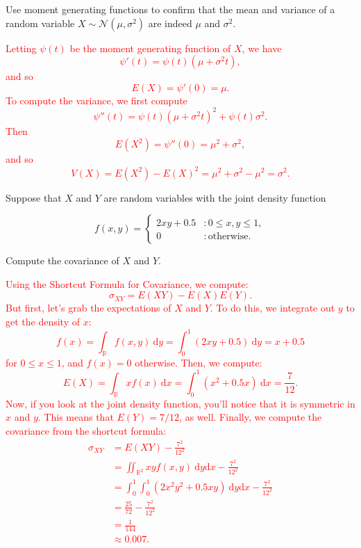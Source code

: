 \documentclass[12pt,reqno]{amsart}
\begin{document}
\prob Use moment generating functions to confirm that the mean and variance of a random variable $X \sim \mathcal{N}(\mu,\sigma^2)$ are indeed $\mu$ and $\sigma^2$.

\bigskip
\textcolor{red}{Letting $\psi(t)$ be the moment generating function of $X$, we have
	\[\psi'(t) = \psi(t) (\mu + \sigma^2 t),
	\]
and so
	\[E(X) = \psi'(0) =  \mu.
	\]
To compute the variance, we first compute
	\[\psi''(t) = \psi(t) (\mu + \sigma^2 t)^2 + \psi(t) \sigma^2.
	\]
Then
	\[E(X^2) = \psi''(0) = \mu^2 + \sigma^2,
	\]
and so
	\[V(X) = E(X^2) - E(X)^2 = \mu^2 + \sigma^2 - \mu^2 = \sigma^2.
	\]}
\bigskip












\prob Suppose that $X$ and $Y$ are random variables with the joint density function

	\[
	f(x,y) = \begin{cases}
	2xy + 0.5 & : 0 \leq x, y \leq 1, \\
	0 & : \text{otherwise}.
	\end{cases}
	\]
	
Compute the covariance of $X$ and $Y$.

\bigskip
\textcolor{red}{Using the Shortcut Formula for Covariance, we compute:
	\[
	\sigma_{XY} = E(XY) - E(X) E(Y).
	\]
But first, let's grab the expectations of $X$ and $Y$. To do this, we integrate out $y$ to get the density of $x$:
	\[f(x) = \int_{\mathbb{R}} f(x,y) \ \text{d} y = \int_0^1 \left( 2xy+0.5\right) \ \text{d}y = x + 0.5
	\]
for $0\leq x\leq 1$, and $f(x)=0$ otherwise. Then, we compute:
	\[E(X) = \int_{\mathbb{R}} x f(x) \ \text{d}x = \int_0^1 (x^2+0.5x) \ \text{d} x = \frac{7}{12}.
	\]
Now, if you look at the joint density function, you'll notice that it is symmetric in $x$ and $y$. This means that $E(Y) = 7/12$, as well. Finally, we compute the covariance from the shortcut formula:
	\begin{align*}
	\sigma_{XY} &= E(XY) - \frac{7^2}{12^2} \\
	&= \iint_{\mathbb{R}^2} xy f(x,y) \ \text{d}y \text{d}x - \frac{7^2}{12^2} \\
	&= \int_0^1 \int_0^1 (2x^2y^2 + 0.5xy) \ \text{d}y \text{d}x - \frac{7^2}{12^2} \\
	&= \frac{25}{72} - \frac{7^2}{12^2} \\
	&= \frac{1}{144} \\
	&\approx 0.007.
	\end{align*}}
\end{document}
